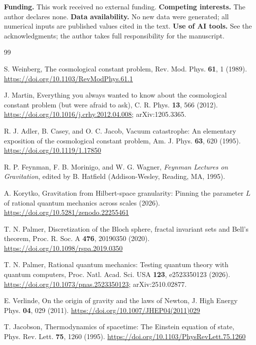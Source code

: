 \documentclass[aps,prd,twocolumn,superscriptaddress,nofootinbib,showkeys]{revtex4-2}
\begin{document}
\textbf{Funding.} This work received no external funding. \textbf{Competing interests.} The author declares none. \textbf{Data availability.} No new data were generated; all numerical inputs are published values cited in the text. \textbf{Use of AI tools.} See the acknowledgments; the author takes full responsibility for the manuscript.

\begin{thebibliography}{99}

 S. Weinberg, The cosmological constant problem, Rev. Mod. Phys. \textbf{61}, 1 (1989). \url{https://doi.org/10.1103/RevModPhys.61.1}

 J. Martin, Everything you always wanted to know about the cosmological constant problem (but were afraid to ask), C. R. Phys. \textbf{13}, 566 (2012). \url{https://doi.org/10.1016/j.crhy.2012.04.008}; arXiv:1205.3365.

 R. J. Adler, B. Casey, and O. C. Jacob, Vacuum catastrophe: An elementary exposition of the cosmological constant problem, Am. J. Phys. \textbf{63}, 620 (1995). \url{https://doi.org/10.1119/1.17850}

 R. P. Feynman, F. B. Morinigo, and W. G. Wagner, \emph{Feynman Lectures on Gravitation}, edited by B. Hatfield (Addison-Wesley, Reading, MA, 1995).

 A. Korytko, Gravitation from Hilbert-space granularity: Pinning the parameter $L$ of rational quantum mechanics across scales (2026). \url{https://doi.org/10.5281/zenodo.22255461}

 T. N. Palmer, Discretization of the Bloch sphere, fractal invariant sets and Bell's theorem, Proc. R. Soc. A \textbf{476}, 20190350 (2020). \url{https://doi.org/10.1098/rspa.2019.0350}

 T. N. Palmer, Rational quantum mechanics: Testing quantum theory with quantum computers, Proc. Natl. Acad. Sci. USA \textbf{123}, e2523350123 (2026). \url{https://doi.org/10.1073/pnas.2523350123}; arXiv:2510.02877.

 E. Verlinde, On the origin of gravity and the laws of Newton, J. High Energy Phys. \textbf{04}, 029 (2011). \url{https://doi.org/10.1007/JHEP04(2011)029}

 T. Jacobson, Thermodynamics of spacetime: The Einstein equation of state, Phys. Rev. Lett. \textbf{75}, 1260 (1995). \url{https://doi.org/10.1103/PhysRevLett.75.1260}


\end{thebibliography}
\end{document}
